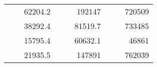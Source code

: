 \begin{table}[H]
\begin{tabular}{|ccrccrccc}
\rowcolor[HTML]{DDFDFF} 
\multicolumn{1}{|c|}{\cellcolor[HTML]{FFFFC7}}                                & \multicolumn{1}{c|}{\cellcolor[HTML]{DDFDFF}}                      & \multicolumn{1}{r|}{\cellcolor[HTML]{DAE8FC}62204.2}   & \multicolumn{1}{c|}{\cellcolor[HTML]{FFFFC7}}                                & \multicolumn{1}{c|}{\cellcolor[HTML]{DDFDFF}}                       & \multicolumn{1}{r|}{\cellcolor[HTML]{DDFDFF}192147}    & \multicolumn{1}{c|}{\cellcolor[HTML]{FFFFC7}}                                & \multicolumn{1}{c|}{\cellcolor[HTML]{DDFDFF}}                      & \multicolumn{1}{r|}{\cellcolor[HTML]{DDFDFF}720509}    \\ \cline{3-3} \cline{6-6} \cline{9-9} 
\multicolumn{1}{|c|}{\cellcolor[HTML]{FFFFC7}}                                & \multicolumn{1}{c|}{\cellcolor[HTML]{DDFDFF}}                      & \multicolumn{1}{r|}{\cellcolor[HTML]{DDFDFF}38292.4}   & \multicolumn{1}{c|}{\cellcolor[HTML]{FFFFC7}}                                & \multicolumn{1}{c|}{\cellcolor[HTML]{DDFDFF}}                       & \multicolumn{1}{r|}{\cellcolor[HTML]{DAE8FC}81519.7}   & \multicolumn{1}{c|}{\cellcolor[HTML]{FFFFC7}}                                & \multicolumn{1}{c|}{\cellcolor[HTML]{DDFDFF}}                      & \multicolumn{1}{r|}{\cellcolor[HTML]{DAE8FC}733485}    \\ \cline{3-3} \cline{6-6} \cline{9-9} 
\rowcolor[HTML]{DDFDFF} 
\multicolumn{1}{|c|}{\cellcolor[HTML]{FFFFC7}}                                & \multicolumn{1}{c|}{\cellcolor[HTML]{DDFDFF}}                      & \multicolumn{1}{r|}{\cellcolor[HTML]{DAE8FC}15795.4}   & \multicolumn{1}{c|}{\cellcolor[HTML]{FFFFC7}}                                & \multicolumn{1}{c|}{\cellcolor[HTML]{DDFDFF}}                       & \multicolumn{1}{r|}{\cellcolor[HTML]{DDFDFF}60632.1}   & \multicolumn{1}{c|}{\cellcolor[HTML]{FFFFC7}}                                & \multicolumn{1}{c|}{\cellcolor[HTML]{DDFDFF}}                      & \multicolumn{1}{r|}{\cellcolor[HTML]{DDFDFF}46861}     \\ \cline{3-3} \cline{6-6} \cline{9-9} 
\multicolumn{1}{|c|}{\cellcolor[HTML]{FFFFC7}}                                & \multicolumn{1}{c|}{\cellcolor[HTML]{DDFDFF}}                      & \multicolumn{1}{r|}{\cellcolor[HTML]{DDFDFF}21935.5}   & \multicolumn{1}{c|}{\cellcolor[HTML]{FFFFC7}}                                & \multicolumn{1}{c|}{\cellcolor[HTML]{DDFDFF}}                       & \multicolumn{1}{r|}{\cellcolor[HTML]{DAE8FC}147891}    & \multicolumn{1}{c|}{\cellcolor[HTML]{FFFFC7}}                                & \multicolumn{1}{c|}{\cellcolor[HTML]{DDFDFF}}                      & \multicolumn{1}{r|}{\cellcolor[HTML]{DAE8FC}762039}    \\ \cline{3-3} \cline{6-6} \cline{9-9} 

\end{tabular}
\end{table}
